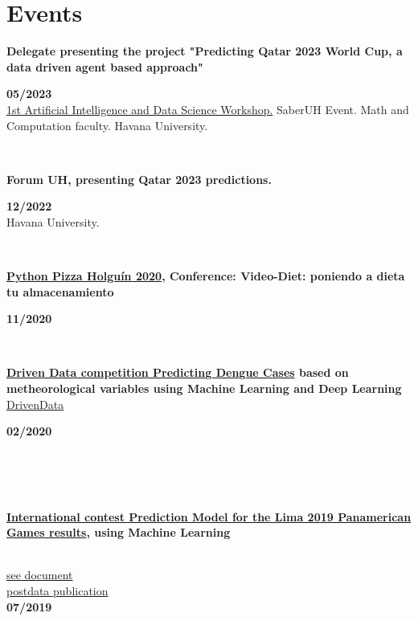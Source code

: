 \documentclass{article}
\begin{document}
\section*{Events}
\begin{minipage}{0.8\textwidth}
    \parbox{0.8\linewidth}{\textbf{Delegate presenting the project "Predicting Qatar 2023 World Cup, a data driven agent based approach" }} \hfill \textbf{05/2023}\\
    \hyperref[sec:workshop]{1st Artificial Intelligence and Data Science Workshop.} SaberUH Event. Math and Computation faculty. Havana University.\\
\end{minipage} \\
\begin{minipage}{0.8\textwidth}
    \parbox{0.8\linewidth}{\textbf{Forum UH, presenting Qatar 2023 predictions.}} \hfill \textbf{12/2022}\\
    Havana University.\\
\end{minipage}\\
\begin{minipage}{0.8\textwidth}
    \parbox{0.8\linewidth}{\textbf{\hyperref[sec:pythonpizza]{Python Pizza Holguín 2020}, Conference: Video-Diet: poniendo a dieta tu almacenamiento}} \hfill \textbf{11/2020}\\
\end{minipage} \\
\begin{minipage}{0.8\textwidth}
    \parbox{0.8\linewidth}{\textbf{\hyperref[sec:dengue]{Driven Data competition Predicting Dengue Cases} based on metheorological variables using Machine Learning and Deep Learning} \href{https://www.drivendata.org/competitions/44/dengai-predicting-disease-spread}{DrivenData}} \hfill \textbf{02/2020}\\
    \\
\end{minipage} \hfill {}\\\\
\begin{minipage}{0.8\textwidth}
    \parbox{0.8\linewidth}{\textbf{\hyperref[sec:panamerican]{International contest Prediction Model for the Lima 2019 Panamerican Games results}, using Machine Learning} }\\
    \href{https://github.com/JavierOramas/PanamericanPredictor/blob/master/panamerican_predictor_paper.pdf}{see document}\\
    \href{http://www.postdata.club/issues/201907/el-medallero-de-lima-2019-que-se-puede-esperar.html}{postdata publication}\\
    \hfill \textbf{07/2019}\\
    \\
\end{minipage} \hfill {}\\
\end{document}
